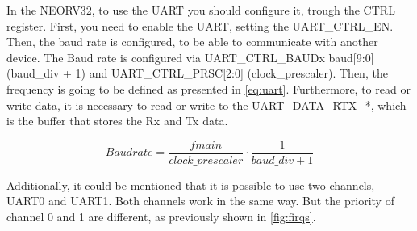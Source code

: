         In the NEORV32, to use the UART you should configure it, trough the CTRL register. First, you need to enable the UART, setting the UART\_CTRL\_EN. Then, the baud rate is configured, to be able to communicate with another device. The Baud rate is configured via UART\_CTRL\_BAUDx baud[9:0] (baud\_div + 1) and UART\_CTRL\_PRSC[2:0] (clock\_prescaler). Then, the frequency is going to be defined as presented in \autoref{eq:uart}. Furthermore, to read or write data, it is necessary to read or write to the UART\_DATA\_RTX\_*, which is the buffer that stores the Rx and Tx data.

        \begin{equation}
            Baud rate = \frac{fmain}{clock\_prescaler} \cdot \frac{1}{baud\_div + 1}
            \label{eq:uart}
        \end{equation}

        Additionally, it could be mentioned that it is possible to use two channels, UART0 and UART1. Both channels work in the same way. But the priority of channel 0 and 1 are different, as previously shown in \autoref{fig:firqs}.

        \newpage

